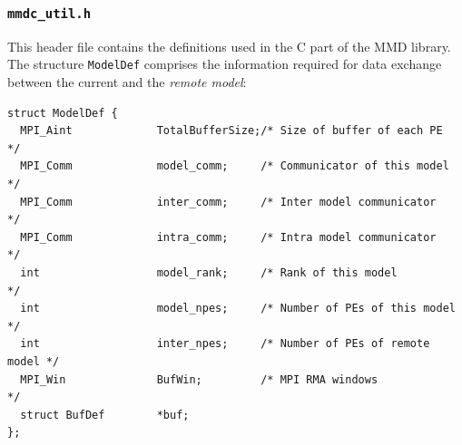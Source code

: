 \documentclass[twoside]{article}
\begin{document}
\subsubsection{{\tt mmdc\_util.h}}
This header file contains the definitions used in the C part of the MMD library.
 The structure \verb|ModelDef| comprises the information required for data 
exchange between the current and the {\it remote model}:
\begin{verbatim}
struct ModelDef {
  MPI_Aint             TotalBufferSize;/* Size of buffer of each PE     */
  MPI_Comm             model_comm;     /* Communicator of this model    */
  MPI_Comm             inter_comm;     /* Inter model communicator      */
  MPI_Comm             intra_comm;     /* Intra model communicator      */
  int                  model_rank;     /* Rank of this model            */
  int                  model_npes;     /* Number of PEs of this model   */
  int                  inter_npes;     /* Number of PEs of remote model */
  MPI_Win              BufWin;         /* MPI RMA windows               */
  struct BufDef        *buf;
};
\end{verbatim}
\end{document}
